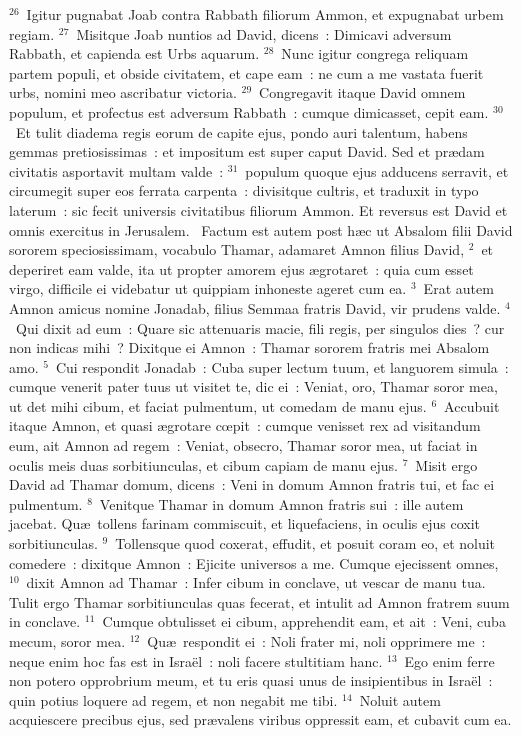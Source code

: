 ${}^{26}$~Igitur pugnabat Joab contra Rabbath filiorum Ammon, et expugnabat urbem regiam.
${}^{27}$~Misitque Joab nuntios ad David, dicens~: Dimicavi adversum Rabbath, et capienda est Urbs aquarum.
${}^{28}$~Nunc igitur congrega reliquam partem populi, et obside civitatem, et cape eam~: ne cum a me vastata fuerit urbs, nomini meo ascribatur victoria.
${}^{29}$~Congregavit itaque David omnem populum, et profectus est adversum Rabbath~: cumque dimicasset, cepit eam.
${}^{30}$~Et tulit diadema regis eorum de capite ejus, pondo auri talentum, habens gemmas pretiosissimas~: et impositum est super caput David. Sed et pr\ae dam civitatis asportavit multam valde~:
${}^{31}$~populum quoque ejus adducens serravit, et circumegit super eos ferrata carpenta~: divisitque cultris, et traduxit in typo laterum~: sic fecit universis civitatibus filiorum Ammon. Et reversus est David et omnis exercitus in Jerusalem.
~Factum est autem post h\ae c ut Absalom filii David sororem speciosissimam, vocabulo Thamar, adamaret Amnon filius David,
${}^{2}$~et deperiret eam valde, ita ut propter amorem ejus \ae grotaret~: quia cum esset virgo, difficile ei videbatur ut quippiam inhoneste ageret cum ea.
${}^{3}$~Erat autem Amnon amicus nomine Jonadab, filius Semmaa fratris David, vir prudens valde.
${}^{4}$~Qui dixit ad eum~: Quare sic attenuaris macie, fili regis, per singulos dies~? cur non indicas mihi~? Dixitque ei Amnon~: Thamar sororem fratris mei Absalom amo.
${}^{5}$~Cui respondit Jonadab~: Cuba super lectum tuum, et languorem simula~: cumque venerit pater tuus ut visitet te, dic ei~: Veniat, oro, Thamar soror mea, ut det mihi cibum, et faciat pulmentum, ut comedam de manu ejus.
${}^{6}$~Accubuit itaque Amnon, et quasi \ae grotare cœpit~: cumque venisset rex ad visitandum eum, ait Amnon ad regem~: Veniat, obsecro, Thamar soror mea, ut faciat in oculis meis duas sorbitiunculas, et cibum capiam de manu ejus.
${}^{7}$~Misit ergo David ad Thamar domum, dicens~: Veni in domum Amnon fratris tui, et fac ei pulmentum.
${}^{8}$~Venitque Thamar in domum Amnon fratris sui~: ille autem jacebat. Qu\ae\ tollens farinam commiscuit, et liquefaciens, in oculis ejus coxit sorbitiunculas.
${}^{9}$~Tollensque quod coxerat, effudit, et posuit coram eo, et noluit comedere~: dixitque Amnon~: Ejicite universos a me. Cumque ejecissent omnes,
${}^{10}$~dixit Amnon ad Thamar~: Infer cibum in conclave, ut vescar de manu tua. Tulit ergo Thamar sorbitiunculas quas fecerat, et intulit ad Amnon fratrem suum in conclave.
${}^{11}$~Cumque obtulisset ei cibum, apprehendit eam, et ait~: Veni, cuba mecum, soror mea.
${}^{12}$~Qu\ae\ respondit ei~: Noli frater mi, noli opprimere me~: neque enim hoc fas est in Isra\"el~: noli facere stultitiam hanc.
${}^{13}$~Ego enim ferre non potero opprobrium meum, et tu eris quasi unus de insipientibus in Isra\"el~: quin potius loquere ad regem, et non negabit me tibi.
${}^{14}$~Noluit autem acquiescere precibus ejus, sed pr\ae valens viribus oppressit eam, et cubavit cum ea.


